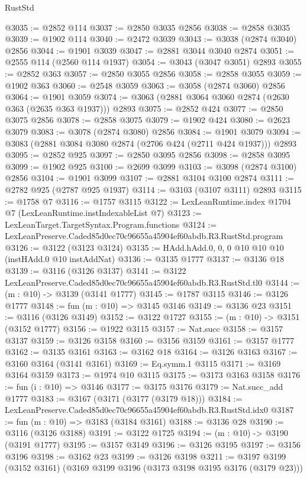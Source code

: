 \begin{lexlean}{RustStd}
\begin{coremodule}
@3035 := @2852 @114
@3037 := @2850 @3035 @2856
@3038 := @2858 @3035
@3039 := @1902 @114
@3040 := @2472 @3039
@3043 := @3038 (@2874 @3040) @2856
@3044 := @1901 @3039
@3047 := @2881 @3044 @3040 @2874
@3051 := @2555 @114 (@2560 @114 @1937)
@3054 := @3043 (@3047 @3051) @2893
@3055 := @2852 @363
@3057 := @2850 @3055 @2856
@3058 := @2858 @3055
@3059 := @1902 @363
@3060 := @2548 @3059
@3063 := @3058 (@2874 @3060) @2856
@3064 := @1901 @3059
@3074 := @3063 (@2881 @3064 @3060 @2874 (@2630 @363 (@2635 @363 @1937))) @2893
@3075 := @2852 @424
@3077 := @2850 @3075 @2856
@3078 := @2858 @3075
@3079 := @1902 @424
@3080 := @2623 @3079
@3083 := @3078 (@2874 @3080) @2856
@3084 := @1901 @3079
@3094 := @3083 (@2881 @3084 @3080 @2874 (@2706 @424 (@2711 @424 @1937))) @2893
@3095 := @2852 @925
@3097 := @2850 @3095 @2856
@3098 := @2858 @3095
@3099 := @1902 @925
@3100 := @2699 @3099
@3103 := @3098 (@2874 @3100) @2856
@3104 := @1901 @3099
@3107 := @2881 @3104 @3100 @2874
@3111 := @2782 @925 (@2787 @925 @1937)
@3114 := @3103 (@3107 @3111) @2893
@3115 := @1758 @7
@3116 := @1757 @3115
@3122 := LexLeanRuntime.index @1704 @7 (LexLeanRuntime.instIndexableList @7)
@3123 := LexLeanTarget.TargetSyntax.Program.functions
@3124 := LexLeanPreserve.Caded85d0ec70c96655a45904ef60abdb.R3.RustStd.program
@3126 := @3122 (@3123 @3124)
@3135 := HAdd.hAdd.{0, 0, 0} @10 @10 @10 (instHAdd.{0} @10 instAddNat)
@3136 := @3135 @1777
@3137 := @3136 @18
@3139 := @3116 (@3126 @3137)
@3141 := @3122 LexLeanPreserve.Caded85d0ec70c96655a45904ef60abdb.R3.RustStd.tl0
@3144 := (m : @10) -> @3139 (@3141 @1777)
@3145 := @1787 @3115
@3146 := @3126 @1777
@3148 := fun (m : @10) => @3145 @3146
@3149 := @3136 @23
@3151 := @3116 (@3126 @3149)
@3152 := @3122 @1727
@3155 := (m : @10) -> @3151 (@3152 @1777)
@3156 := @1922 @3115
@3157 := Nat.succ
@3158 := @3157 @3137
@3159 := @3126 @3158
@3160 := @3156 @3159
@3161 := @3157 @1777
@3162 := @3135 @3161
@3163 := @3162 @18
@3164 := @3126 @3163
@3167 := @3160 @3164 (@3141 @3161)
@3169 := Eq.symm.{1} @3115
@3171 := @3169 @3164 @3159
@3173 := @1974 @10 @3115
@3175 := @3173 @3163 @3158
@3176 := fun (i : @10) => @3146
@3177 := @3175 @3176
@3179 := Nat.succ_add @1777
@3183 := @3167 (@3171 (@3177 (@3179 @18)))
@3184 := LexLeanPreserve.Caded85d0ec70c96655a45904ef60abdb.R3.RustStd.idx0
@3187 := fun (m : @10) => @3183 (@3184 @3161)
@3188 := @3136 @28
@3190 := @3116 (@3126 @3188)
@3191 := @3122 @1725
@3194 := (m : @10) -> @3190 (@3191 @1777)
@3195 := @3157 @3149
@3196 := @3126 @3195
@3197 := @3156 @3196
@3198 := @3162 @23
@3199 := @3126 @3198
@3211 := @3197 @3199 (@3152 @3161) (@3169 @3199 @3196 (@3173 @3198 @3195 @3176 (@3179 @23)))

\end{coremodule}
\end{lexlean}
